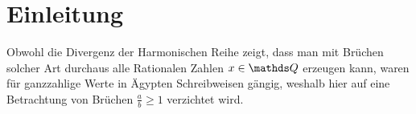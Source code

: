 \section{Einleitung}

Obwohl die Divergenz der Harmonischen Reihe zeigt, dass man mit Brüchen solcher Art durchaus alle Rationalen Zahlen $x \in \Q$ erzeugen kann, waren für ganzzahlige Werte in Ägypten Schreibweisen gängig, weshalb hier auf eine Betrachtung von Brüchen $\frac{a}{b} \geq 1$ verzichtet wird.